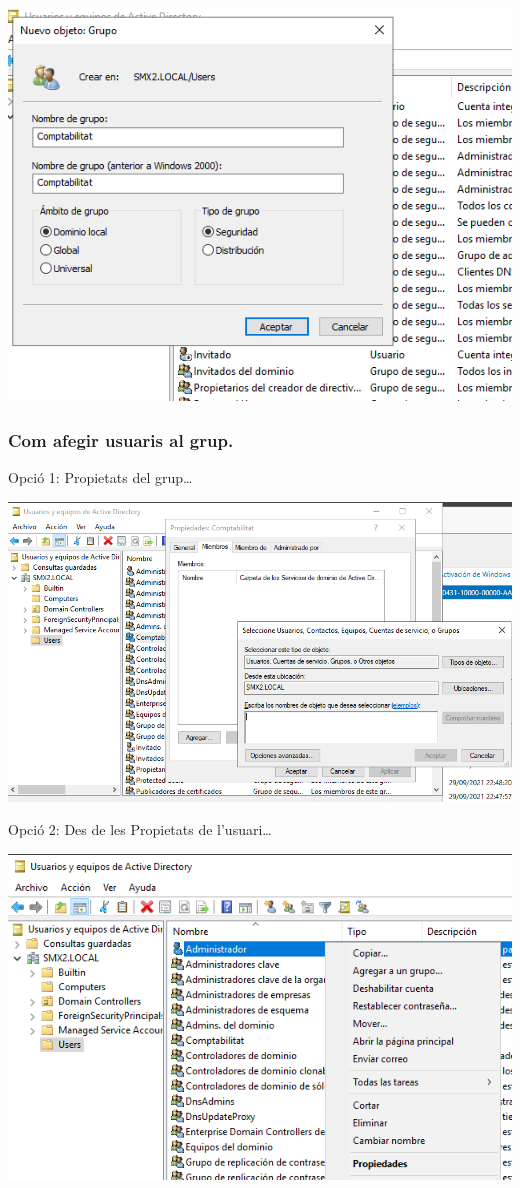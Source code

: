 \documentclass[
  a4paper,
]{article}
\begin{document}
\includegraphics{png/usuaris12.png}

\subsubsection{Com afegir usuaris al
grup.}\label{com-afegir-usuaris-al-grup.}

Opció 1: Propietats del grup\ldots{}

\includegraphics{png/usuaris13.png}

Opció 2: Des de les Propietats de l'usuari\ldots{}

\includegraphics{png/usuaris14.png}
\end{document}
